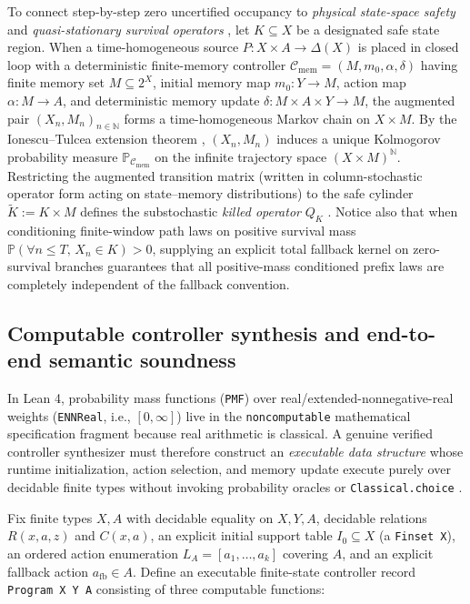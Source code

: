 \documentclass[11pt,a4paper]{article}
\begin{document}
To connect step-by-step zero uncertified occupancy to \emph{physical
state-space safety} and \emph{quasi-stationary survival operators}
\citep{doob1957, darrochSeneta1965, collet2013}, let \(K \subseteq X\)
be a designated safe state region. When a time-homogeneous source
\(P: X \times A \to \Delta(X)\) is placed in closed loop with a
deterministic finite-memory controller
\(\mathcal{C}_{\mathrm{mem}} = (M, m_0, \alpha, \delta)\) having finite
memory set \(M \subseteq 2^X\), initial memory map \(m_0: Y \to M\),
action map \(\alpha: M \to A\), and deterministic memory update
\(\delta: M \times A \times Y \to M\), the augmented pair
\((X_n, M_n)_{n \in \mathbb{N}}\) forms a time-homogeneous Markov chain
on \(X \times M\). By the Ionescu--Tulcea extension theorem
\citep{kallenberg2021}, \((X_n, M_n)\) induces a unique Kolmogorov
probability measure \(\mathbb{P}_{\mathcal{C}_{\mathrm{mem}}}\) on the
infinite trajectory space \((X \times M)^{\mathbb{N}}\). Restricting the
augmented transition matrix (written in column-stochastic operator form
acting on state--memory distributions) to the safe cylinder
\(\widetilde{K} := K \times M\) defines the substochastic \emph{killed
operator} \(Q_K\) \citep{seneta1981, hoelzl2017}. Notice also that when
conditioning finite-window path laws on positive survival mass
\(\mathbb{P}(\forall n \le T,\, X_n \in K) > 0\), supplying an explicit
total fallback kernel on zero-survival branches guarantees that all
positive-mass conditioned prefix laws are completely independent of the
fallback convention.

\subsection{Computable controller synthesis and end-to-end semantic
soundness}\label{computable-controller-synthesis-and-end-to-end-semantic-soundness}

In Lean 4, probability mass functions (\texttt{PMF}) over
real/extended-nonnegative-real weights (\texttt{ENNReal}, i.e.,
\([0,\infty]\)) live in the \texttt{noncomputable} mathematical
specification fragment because real arithmetic is classical. A genuine
verified controller synthesizer must therefore construct an
\emph{executable data structure} whose runtime initialization, action
selection, and memory update execute purely over decidable finite types
without invoking probability oracles or \texttt{Classical.choice}
\citep{mouraUllrich2021, schaeffelerAbdulaziz2023}.

Fix finite types \(X, A\) with decidable equality on \(X, Y, A\),
decidable relations \(R(x,a,z)\) and \(C(x,a)\), an explicit initial
support table \(I_0 \subseteq X\) (a \texttt{Finset\ X}), an ordered
action enumeration \(L_A = [a_1, \dots, a_k]\) covering \(A\), and an
explicit fallback action \(a_{\mathrm{fb}} \in A\). Define an executable
finite-state controller record \texttt{Program\ X\ Y\ A} consisting of
three computable functions:
\end{document}
